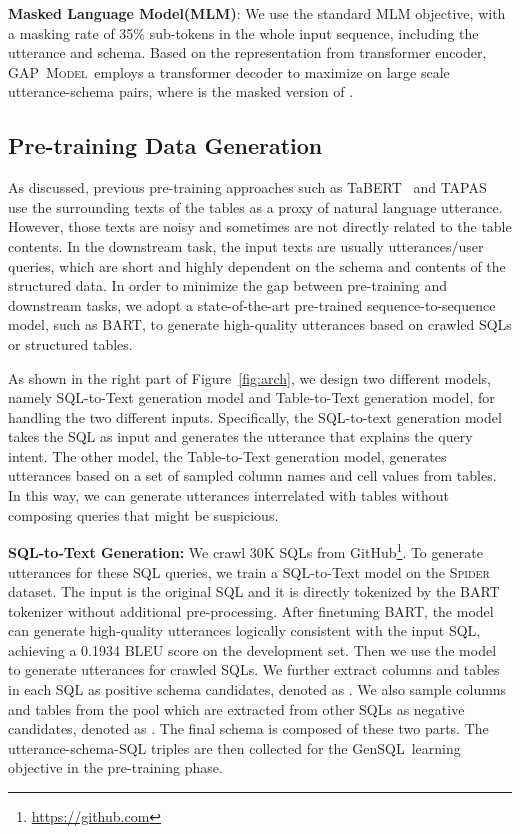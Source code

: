 \documentclass[letterpaper]{article} \usepackage{aaai21}  \usepackage{times}  \usepackage{helvet} \usepackage{courier}  \usepackage[hyphens]{url}  \usepackage{graphicx} \usepackage{booktabs}
\newcommand{\modelnamelm}{\textsc{GAP~Model}}
\newcommand{\gensql}{GenSQL}
\begin{document}
\smallskip \noindent \textbf{Masked Language Model(MLM)}: 
We use the standard MLM objective, with a masking rate of 35\% sub-tokens in the whole input sequence, including the utterance and schema.
Based on the representation from transformer encoder, \modelnamelm~employs a transformer decoder to maximize  on large scale utterance-schema pairs, where  is the masked version of .

\subsection{Pre-training Data Generation}

As discussed, previous pre-training approaches such as TaBERT~\cite{yin2020tabert} and TAPAS~\cite{herzig2020tapas} use the surrounding texts of the tables as a proxy of natural language utterance.
However, those texts are noisy and sometimes are not directly related to the table contents.
In the downstream task, the input texts are usually utterances/user queries, which are short and highly dependent on the schema and contents of the structured data.
In order to minimize the gap between pre-training and downstream tasks, we adopt a state-of-the-art pre-trained sequence-to-sequence model, such as BART, to generate high-quality utterances based on crawled SQLs or structured tables.

As shown in the right part of Figure~\ref{fig:arch}, we design two different models, namely SQL-to-Text generation model and Table-to-Text generation model, for handling the two different inputs.
Specifically, the SQL-to-text generation model takes the SQL as input and generates the utterance that explains the query intent.
The other model, the Table-to-Text generation model, generates utterances based on a set of sampled column names and cell values from tables.
In this way, we can generate utterances interrelated with tables without composing queries that might be suspicious.

\smallskip \noindent \textbf{SQL-to-Text Generation:}
We crawl 30K SQLs from GitHub\footnote{\url{https://github.com}}.
To generate utterances for these SQL queries, we train a SQL-to-Text model on the \textsc{Spider} dataset.
The input is the original SQL and it is directly tokenized by the BART tokenizer without additional pre-processing.
After finetuning BART, the model can generate high-quality utterances logically consistent with the input SQL,
achieving a 0.1934 BLEU score on the development set.
Then we use the model to generate utterances for crawled SQLs.
We further extract columns and tables in each SQL as positive schema candidates, denoted as . 
We also sample columns and tables from the pool which are extracted from other SQLs as negative candidates, denoted as .
The final schema is composed of these two parts.
The utterance-schema-SQL triples are then collected for the \gensql~learning objective in the pre-training phase.
\end{document}

